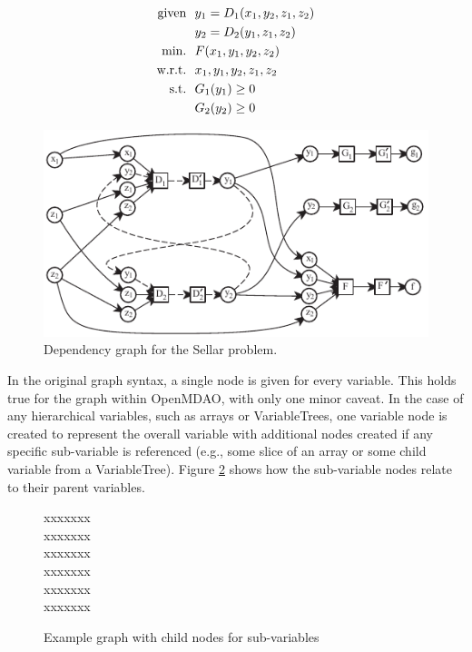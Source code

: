 \documentclass[]{aiaa-tc} %
\newcommand{\txt}{\textrm}
\begin{document}
    \begin{align}
        \txt{given} & \ \ y_1 = D_1(x_1,y_2,z_1,z_2) \notag
        \\      & \ \ y_2 = D_2(y_1,z_1,z_2) \notag
        \\\txt{min.} &\ \ F(x_1,y_1,y_2,z_2) \notag
        \\\txt{w.r.t.} & \ \ x_1,y_1,y_2,z_1,z_2 \notag
        \\\txt{s.t.} & \ \ G_1(y_1) \geq 0 \notag
        \\     & \ \ G_2(y_2) \geq 0
        \label{eqn:sellar_formulation}
    \end{align}


    \begin{figure}[!htb]\begin{center}
      \includegraphics[width=.8\textwidth]{images/sellar_cycles}
      \caption{ Dependency graph for the Sellar problem. \label{fig:sellar_graph}}
    \end{center}\end{figure}

    In the original graph syntax, a single node is given for every variable. This holds true for the graph
    within OpenMDAO, with only one minor caveat. In the case of any hierarchical variables, such as arrays
    or VariableTrees, one variable node is created to represent the overall variable with additional nodes
    created if any specific sub-variable is referenced (e.g., some slice of an array or some child variable from a
    VariableTree). Figure \ref{fig:subvars} shows how the sub-variable nodes relate to their parent variables.

     \begin{figure}[!htb]\begin{center}
      xxxxxxx\\xxxxxxx\\xxxxxxx\\xxxxxxx\\xxxxxxx\\xxxxxxx\\
      \caption{ Example graph with child nodes for sub-variables \label{fig:subvars}}
    \end{center}\end{figure}
\end{document}
